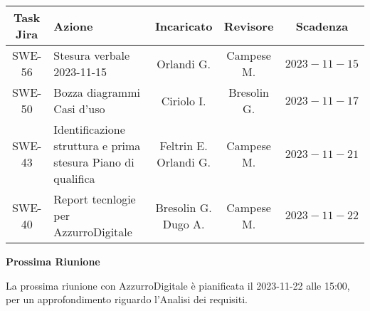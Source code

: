 \documentclass[10pt, a4paper]{article}
\begin{document}
{\renewcommand{\arraystretch}{1.5}
\begin{tabularx}{\textwidth}{c|X|c|c|c}
\textbf{Task Jira} & \textbf{Azione} & \textbf{Incaricato} & \textbf{Revisore} & \textbf{Scadenza} \\
\hline
SWE-56 &
Stesura verbale 2023-11-15 &
Orlandi G. &
Campese M. &
$2023-11-15$ \\


\hline
SWE-50 & 
Bozza diagrammi Casi d'uso & 
Ciriolo I. & 
Bresolin G. & 
$2023-11-17$ \\
\hline
SWE-43 &
Identificazione struttura e prima stesura Piano di qualifica &
\quantities{Feltrin E. \\Orlandi G.} &
Campese M. &
$2023-11-21$ \\
\hline
SWE-40 &
Report tecnlogie per AzzurroDigitale &
\quantities{Bresolin G. \\Dugo A.} &
Campese M. &
$2023-11-22$ \\

\end{tabularx}}


\vspace{3em}


\textbf{Prossima Riunione}

La prossima riunione con AzzurroDigitale è pianificata il 2023-11-22 alle 15:00, per un approfondimento riguardo l'Analisi dei requisiti.
\end{document}

